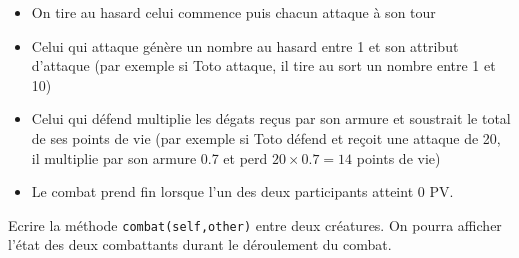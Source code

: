 \documentclass[11pt,a4paper]{article}
\begin{document}
\begin{itemize}
    \item[\ding{192}] On tire au hasard celui commence puis chacun attaque à son tour
    \item[\ding{193}] Celui qui attaque génère un nombre au hasard entre 1 et son attribut d'attaque (par exemple si Toto attaque, il tire au sort un nombre entre 1 et 10)
    \item[\ding{194}] Celui qui défend multiplie les dégats reçus par son armure et soustrait le total de ses points de vie (par exemple si Toto défend et reçoit une attaque de 20, il multiplie par son armure 0.7 et perd $20 \times 0.7=14$ points de vie)
    \item[\ding{195}] Le combat prend fin lorsque l'un des deux participants atteint 0 PV.
\end{itemize} 
Ecrire la méthode {\tt combat(self,other)} entre deux créatures. On pourra afficher l'état des deux combattants durant le déroulement du combat.
\FinListe
\end{document}

